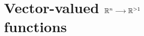 \chapter[Vector-valued $\Rtn\longrightarrow\R^{>1}$ functions]{Vector-valued $\Rtn\longrightarrow\R^{>1}$ \\ functions}
\thispagestyle{noheaders}
